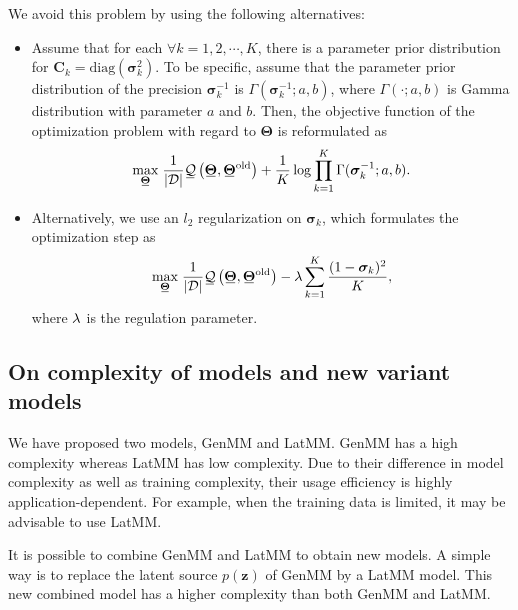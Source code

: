 We avoid this problem by using the following alternatives:
\begin{itemize}
\item Assume that for each $\forall k=1, 2, \cdots, K$, there is a parameter prior distribution for $\bm{C}_k=\mathrm{diag}(\bm{\sigma}_k^2)$.
  To be specific, assume that the parameter prior distribution of the precision $\bm{\sigma}_k^{-1}$ is
  $\Gamma(\bm{\sigma}_k^{-1};a, b)$, where $\Gamma(\cdot; a, b)$ is
  Gamma distribution with parameter $a$ and $b$. Then, the objective function of the optimization problem with regard to $\bm{\Theta}$ is reformulated as
  \begin{equation}\label{eq-latmm-obj1}
    \umax{ \ubar{\bm{\Theta}}}   \frac{1}{\abs{\Dd}}
    \ubar{\Qq}\left(\ubar{\bm{\Theta}},\ubar{\bm{\Theta}}^{\mathrm{old}} \right)
    +\frac{1}{K}
    \log\prod_{k=1}^K
    \Gamma(\bm{\sigma}_k^{-1};
    a, b).
  \end{equation}
\item Alternatively, we use an $l_2$ regularization on $\bm{\sigma}_k$,
  which formulates the optimization step as
  \begin{equation}
    \umax{\ubar{\bm{\Theta}}}   \frac{1}{\abs{\Dd}} \ubar{\Qq}\left(\ubar{\bm{\Theta}},\ubar{\bm{\Theta}}^{\mathrm{old}}\right)-\lambda \sum_{k=1}^K \frac{(1- \bm{\sigma}_k)^2}{K},
  \end{equation}
  where $\lambda$ is the regulation parameter.
\end{itemize}

\subsection{On complexity of models and new variant models}
We have proposed two models, GenMM and LatMM. GenMM has a high complexity whereas LatMM has low complexity. Due to their difference in model complexity as well as training complexity, their usage efficiency is highly application-dependent. For example, when the training data is limited, it may be advisable to use LatMM.

It is possible to combine GenMM and LatMM to obtain new models. A simple way is to replace the latent source $p(\bm{z})$ of GenMM by a LatMM model. 
This new combined model has a higher complexity than both GenMM and LatMM. %

